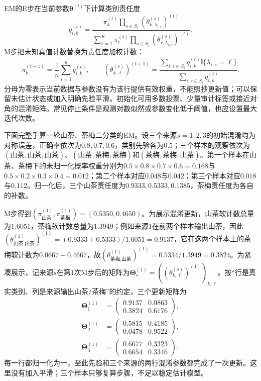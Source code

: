 EM的E步在当前参数$\bm{\theta}^{(t)}$下计算类别责任度
\begin{equation}
  q_{i,k}^{(t)}
  =
  \frac{\pi_k^{(t)}
    \prod_{s\in S_i}
    \left(\theta^{(s)}_{k,\lambda_{i,s}}\right)^{(t)}}
  {\sum_{r=1}^{K}\pi_r^{(t)}
    \prod_{s\in S_i}
    \left(\theta^{(s)}_{r,\lambda_{i,s}}\right)^{(t)}}.
  \label{eq:knowledge-fusion-dawid-skene-e-step}
\end{equation}
M步把未知真值计数替换为责任度加权计数：
\begin{equation}
  \pi_k^{(t+1)}
  =\frac{1}{n}\sum_{i=1}^{n}q_{i,k}^{(t)},
  \qquad
  \left(\theta^{(s)}_{k,\ell}\right)^{(t+1)}
  =
  \frac{\sum_{i:s\in S_i}
    q_{i,k}^{(t)}\mathbb{I}\{\lambda_{i,s}=\ell\}}
  {\sum_{i:s\in S_i}q_{i,k}^{(t)}}.
  \label{eq:knowledge-fusion-dawid-skene-m-step}
\end{equation}
分母为零表示当前数据与参数没有为该行提供有效权重，不能照抄更新值；可以保留未估计状态或加入明确先验平滑。初始化可用多数投票、少量审计标签或接近对角的混淆矩阵。常见停止条件是观测对数似然或参数变化低于阈值，也应设置最大迭代次数。

下面完整手算一轮山茶、茶梅二分类的EM。设三个来源$s=1,2,3$的初始混淆均为对称误差，正确率依次为$0.8,0.7,0.6$，类别先验各为$0.5$；三个样本的观察依次为$(\text{山茶},\text{山茶},\text{山茶})$、$(\text{山茶},\text{茶梅},\text{茶梅})$和$(\text{茶梅},\text{茶梅},\text{山茶})$。第一个样本在山茶、茶梅下的未归一化概率权重分别为$0.5\times0.8\times0.7\times0.6=0.168$与$0.5\times0.2\times0.3\times0.4=0.012$；第二个样本对应$0.048$与$0.042$；第三个样本对应$0.018$与$0.112$。归一化后，三个山茶责任度为$0.9333,0.5333,0.1385$，茶梅责任度为各自的补数。

M步得到$(\pi_{\text{山茶}}^{(1)},\pi_{\text{茶梅}}^{(1)})=(0.5350,0.4650)$。为展示混淆更新，山茶软计数总量为$1.6051$，茶梅软计数总量为$1.3949$；例如来源1在前两个样本输出山茶，因此$\left(\theta^{(1)}_{\text{山茶},\text{山茶}}\right)^{(1)}=(0.9333+0.5333)/1.6051=0.9137$，它在这两个样本上的茶梅软计数为$0.0667+0.4667$，故$\left(\theta^{(1)}_{\text{茶梅},\text{山茶}}\right)^{(1)}=0.5334/1.3949=0.3824$。为紧凑展示，记来源$s$在第1次M步后的矩阵为$\bm{\Theta}_s^{(1)}=\left(\left(\theta^{(s)}_{k,\ell}\right)^{(1)}\right)_{k,\ell}$。按“行是真实类别、列是来源输出山茶/茶梅”的约定，三个更新矩阵为
\[
  \begin{aligned}
    \bm{\Theta}_1^{(1)}
    &=
    \begin{pmatrix}
      0.9137 & 0.0863 \\
      0.3824 & 0.6176
    \end{pmatrix},\\
    \bm{\Theta}_2^{(1)}
    &=
    \begin{pmatrix}
      0.5815 & 0.4185 \\
      0.0478 & 0.9522
    \end{pmatrix},\\
    \bm{\Theta}_3^{(1)}
    &=
    \begin{pmatrix}
      0.6677 & 0.3323 \\
      0.6654 & 0.3346
    \end{pmatrix}.
  \end{aligned}
\]
每一行都归一化为一，至此先验和三个来源的两行混淆参数都完成了一次更新。这里没有加入平滑；三个样本只够复算步骤，不足以稳定估计模型。

